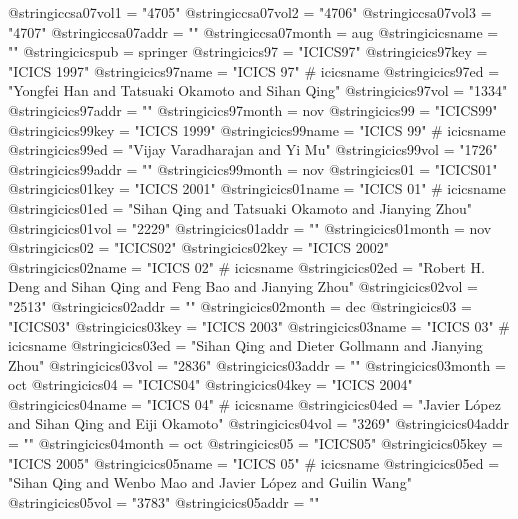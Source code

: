 @string{iccsa07vol1 =           "4705"}
@string{iccsa07vol2 =           "4706"}
@string{iccsa07vol3 =           "4707"}
@string{iccsa07addr =           ""}
@string{iccsa07month =          aug}
@string{icicsname =             ""}
@string{icicspub =              springer}
@string{icics97 =               "ICICS97"}
@string{icics97key =            "ICICS 1997"}
@string{icics97name =           "ICICS 97" # icicsname}
@string{icics97ed =             "Yongfei Han and Tatsuaki Okamoto and Sihan Qing"}
@string{icics97vol =            "1334"}
@string{icics97addr =           ""}
@string{icics97month =          nov}
@string{icics99 =               "ICICS99"}
@string{icics99key =            "ICICS 1999"}
@string{icics99name =           "ICICS 99" # icicsname}
@string{icics99ed =             "Vijay Varadharajan and Yi Mu"}
@string{icics99vol =            "1726"}
@string{icics99addr =           ""}
@string{icics99month =          nov}
@string{icics01 =               "ICICS01"}
@string{icics01key =            "ICICS 2001"}
@string{icics01name =           "ICICS 01" # icicsname}
@string{icics01ed =             "Sihan Qing and Tatsuaki Okamoto and Jianying Zhou"}
@string{icics01vol =            "2229"}
@string{icics01addr =           ""}
@string{icics01month =          nov}
@string{icics02 =               "ICICS02"}
@string{icics02key =            "ICICS 2002"}
@string{icics02name =           "ICICS 02" # icicsname}
@string{icics02ed =             "Robert H. Deng and Sihan Qing and Feng Bao and Jianying Zhou"}
@string{icics02vol =            "2513"}
@string{icics02addr =           ""}
@string{icics02month =          dec}
@string{icics03 =               "ICICS03"}
@string{icics03key =            "ICICS 2003"}
@string{icics03name =           "ICICS 03" # icicsname}
@string{icics03ed =             "Sihan Qing and Dieter Gollmann and Jianying Zhou"}
@string{icics03vol =            "2836"}
@string{icics03addr =           ""}
@string{icics03month =          oct}
@string{icics04 =               "ICICS04"}
@string{icics04key =            "ICICS 2004"}
@string{icics04name =           "ICICS 04" # icicsname}
@string{icics04ed =             "Javier L{\'o}pez and Sihan Qing and Eiji Okamoto"}
@string{icics04vol =            "3269"}
@string{icics04addr =           ""}
@string{icics04month =          oct}
@string{icics05 =               "ICICS05"}
@string{icics05key =            "ICICS 2005"}
@string{icics05name =           "ICICS 05" # icicsname}
@string{icics05ed =             "Sihan Qing and Wenbo Mao and Javier L{\'o}pez and Guilin Wang"}
@string{icics05vol =            "3783"}
@string{icics05addr =           ""}

